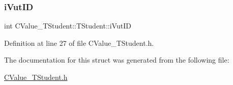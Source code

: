 \subsubsection{\texorpdfstring{i\+Vut\+ID}{iVutID}}
{\footnotesize\ttfamily int C\+Value\+\_\+\+T\+Student\+::\+T\+Student\+::i\+Vut\+ID}



Definition at line 27 of file C\+Value\+\_\+\+T\+Student.\+h.



The documentation for this struct was generated from the following file\+:\begin{DoxyCompactItemize}
\item 
\hyperlink{_c_value___t_student_8h}{C\+Value\+\_\+\+T\+Student.\+h}\end{DoxyCompactItemize}
